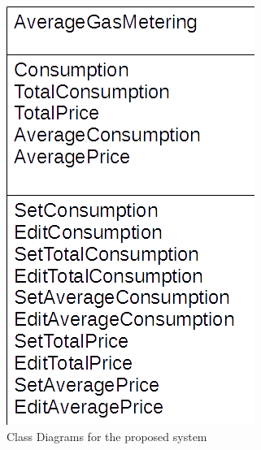 \begin{figure}[H]
    \includegraphics[width=\textwidth]{./AverageGasMetering.png}
    \caption{Class Diagrams for the proposed system} \label{fig:AverageGasMetering Class Diagram}
\end{figure}
